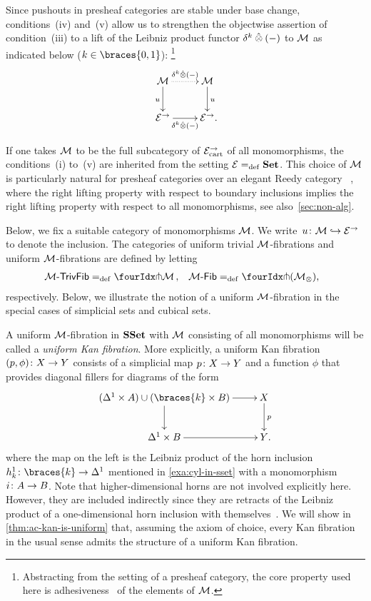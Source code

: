\documentclass[reqno,10pt,a4paper,oneside,draft]{amsart}
\begin{document}
\begin{remark} \label{rem-lift-suitable}
Since pushouts in presheaf categories are stable under base change, conditions~(iv) and~(v) allow us to strengthen the objectwise assertion of condition~(iii) to a lift of the Leibniz product functor $\kcyl \hatotimes (-)$ to $\cal{M}$ as indicated below ($k \in \braces{0, 1}$):%
\footnote{Abstracting from the setting of a presheaf category, the core property used here is adhesiveness~\cite{garner-lack:adhesive} of the elements of $\cal{M}$.}
\[
\xymatrix{
  \cal{M}
  \ar@{.>}[r]^{\kcyl \hatotimes (-)}
  \ar[d]_{u}
&
  \cal{M}
  \ar[d]^{u}
\\
  \catE^\to
  \ar[r]_{\kcyl \hatotimes (-)}
&
  \catE^\to
\rlap{.}}
\]
\end{remark}

If one takes $\cal{M}$ to be the full subcategory of $\catE_\cart^\to$ of all monomorphisms, the 
conditions~(i) to~(v) are inherited from the setting $\calE \defeq \Set$. This choice of $\cal{M}$
is particularly natural for presheaf categories over an elegant Reedy category~\cite{bergner-rezk-elegant} , where the right lifting property
with respect to boundary inclusions implies the right lifting property with respect to all monomorphisms,
see also~\cref{sec:non-alg}.  

Below, we fix a suitable category of monomorphisms $\cal{M}$.
We write~$u \co \cal{M} \hookrightarrow \catE^\to$ to denote the inclusion.
The categories of uniform trivial $\cal{M}$-fibrations and uniform $\cal{M}$-fibrations are defined by letting
\[
\begin{aligned}
  \TrivFib{\cal{M}} &\defeq \liftr{\cal{M}}
\, ,&
  \Fib{\cal{M}} &\defeq \liftr{(\cal{M}_\otimes)}
\rlap{,}
\end{aligned}
\]
respectively. Below, we illustrate the notion of a uniform $\cal{M}$-fibration in the special cases of simplicial sets and cubical sets.


\begin{example}
A uniform $\cal{M}$-fibration in $\SSet$ with $\cal{M}$ consisting of all  monomorphisms will be called a \emph{uniform Kan fibration}.
More explicitly, a uniform Kan fibration $(p, \phi) \co X \to Y$ consists of a simplicial map $p \co X \to Y$ and a function $\phi$ that provides diagonal fillers for diagrams of the form
\[
\xymatrix{
  (\Delta^1 \times A) \cup (\braces{k} \times B)
  \ar[r]
  \ar[d]
&
  X
  \ar[d]^{p}
\\
  \Delta^1 \times B
  \ar[r]
&
  Y
\rlap{.}}
\]
where the map on the left is the Leibniz product of the horn inclusion $h_k^1 \co \braces{k} \to \Delta^1$ mentioned in \cref{exa:cyl-in-sset} with a  monomorphism $i \co A \to B$.
Note that higher-dimensional horns are not involved explicitly here.
However, they are included indirectly since they are retracts of the Leibniz product of a one-dimensional horn inclusion with themselves~\cite[Chap.~IV, Sec.~2]{gabriel-zisman:calculus-of-fractions}.
We will show in \cref{thm:ac-kan-is-uniform} that, assuming the axiom of choice, every Kan fibration in the usual sense admits the structure of a uniform Kan fibration.
\end{example}
\end{document}
